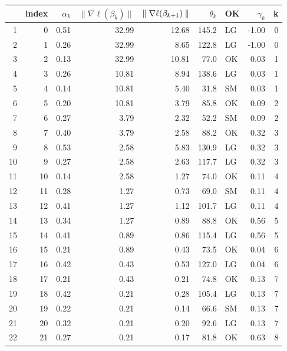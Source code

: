 \begin{table}[ht!]
\begin{center}
\begin{tabular}{rrrrrrlrr}
  \hline
 & index & $\alpha_k$ & $\parallel \nabla \ell( \beta_k) \parallel$ & $\parallel \nabla \ell( \betak1) \parallel$ & $\theta_k$ & OK & $\gamma_k$ & k \\ 
  \hline
1 & 0 & 0.51 & 32.99 & 12.68 & 145.2 & LG & -1.00 & 0 \\ 
  2 & 1 & 0.26 & 32.99 & 8.65 & 122.8 & LG & -1.00 & 0 \\ 
  3 & 2 & 0.13 & 32.99 & 10.81 & 77.0 & OK & 0.03 & 1 \\ 
  4 & 3 & 0.26 & 10.81 & 8.94 & 138.6 & LG & 0.03 & 1 \\ 
  5 & 4 & 0.14 & 10.81 & 5.40 & 31.8 & SM & 0.03 & 1 \\ 
  6 & 5 & 0.20 & 10.81 & 3.79 & 85.8 & OK & 0.09 & 2 \\ 
  7 & 6 & 0.27 & 3.79 & 2.32 & 52.2 & SM & 0.09 & 2 \\ 
  8 & 7 & 0.40 & 3.79 & 2.58 & 88.2 & OK & 0.32 & 3 \\ 
  9 & 8 & 0.53 & 2.58 & 5.83 & 130.9 & LG & 0.32 & 3 \\ 
  10 & 9 & 0.27 & 2.58 & 2.63 & 117.7 & LG & 0.32 & 3 \\ 
  11 & 10 & 0.14 & 2.58 & 1.27 & 74.0 & OK & 0.11 & 4 \\ 
  12 & 11 & 0.28 & 1.27 & 0.73 & 69.0 & SM & 0.11 & 4 \\ 
  13 & 12 & 0.41 & 1.27 & 1.12 & 101.7 & LG & 0.11 & 4 \\ 
  14 & 13 & 0.34 & 1.27 & 0.89 & 88.8 & OK & 0.56 & 5 \\ 
  15 & 14 & 0.41 & 0.89 & 0.86 & 115.4 & LG & 0.56 & 5 \\ 
  16 & 15 & 0.21 & 0.89 & 0.43 & 73.5 & OK & 0.04 & 6 \\ 
  17 & 16 & 0.42 & 0.43 & 0.53 & 127.0 & LG & 0.04 & 6 \\ 
  18 & 17 & 0.21 & 0.43 & 0.21 & 74.8 & OK & 0.13 & 7 \\ 
  19 & 18 & 0.42 & 0.21 & 0.28 & 105.4 & LG & 0.13 & 7 \\ 
  20 & 19 & 0.22 & 0.21 & 0.14 & 66.6 & SM & 0.13 & 7 \\ 
  21 & 20 & 0.32 & 0.21 & 0.20 & 92.6 & LG & 0.13 & 7 \\ 
  22 & 21 & 0.27 & 0.21 & 0.17 & 81.8 & OK & 0.63 & 8 \\ 

\end{tabular}
\end{center}
\end{table}
